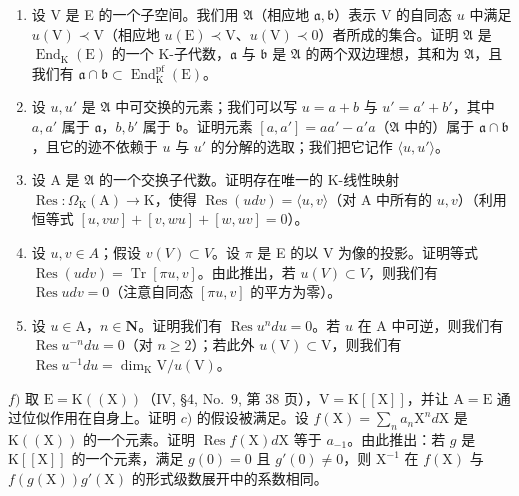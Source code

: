 \begin{enumerate}
\def\labelenumi{\alph{enumi})}
\item
  设 V 是 E 的一个子空间。我们用 \(\mathfrak{A}\)（相应地 \(\mathfrak{a},\mathfrak{b}\)）表示 V 的自同态 \(u\) 中满足 \(u(\mathrm{V})\prec \mathrm{V}\)（相应地 \(u(\mathrm{E})\prec \mathrm{V}\)、\(u(\mathrm{V})\prec 0\)）者所成的集合。证明 \(\mathfrak{A}\) 是 \(\operatorname{End}_{\mathrm{K}}(\mathrm{E})\) 的一个 K-子代数，\(\mathfrak{a}\) 与 \(\mathfrak{b}\) 是 \(\mathfrak{A}\) 的两个双边理想，其和为 \(\mathfrak{A}\)，且我们有 \(\mathfrak{a} \cap \mathfrak{b} \subset \operatorname{End}_{\mathrm{K}}^{\mathrm{pf}}(\mathrm{E})\)。
\item
  设 \(u, u'\) 是 \(\mathfrak{A}\) 中可交换的元素；我们可以写 \(u = a + b\) 与 \(u' = a' + b'\)，其中 \(a, a'\) 属于 \(\mathfrak{a}\)，\(b, b'\) 属于 \(\mathfrak{b}\)。证明元素 \([a, a'] = aa' - a'a\)（\(\mathfrak{A}\) 中的）属于 \(\mathfrak{a} \cap \mathfrak{b}\)，且它的迹不依赖于 \(u\) 与 \(u'\) 的分解的选取；我们把它记作 \(\langle u, u' \rangle\)。
\item
  设 A 是 \(\mathfrak{A}\) 的一个交换子代数。证明存在唯一的 K-线性映射 \(\operatorname{Res}:\Omega_{\mathrm{K}}(\mathrm{A})\to \mathrm{K}\)，使得 \(\operatorname{Res}(udv) = \langle u,v\rangle\)（对 A 中所有的 \(u,v\)）（利用恒等式 \([u,vw] + [v,wu] + [w,uv] = 0\)）。
\item
  设 \(u, v \in A\)；假设 \(v(V) \subset V\)。设 \(\pi\) 是 E 的以 V 为像的投影。证明等式 \(\operatorname{Res}(u dv) = \operatorname{Tr}[\pi u, v]\)。由此推出，若 \(u(V) \subset V\)，则我们有 \(\operatorname{Res} u dv = 0\)（注意自同态 \([\pi u, v]\) 的平方为零）。
\item
  设 \(u \in \mathrm{A}\)，\(n \in \mathbf{N}\)。证明我们有 \(\operatorname{Res} u^n du = 0\)。若 \(u\) 在 \(\mathrm{A}\) 中可逆，则我们有 \(\operatorname{Res} u^{-n} du = 0\)（对 \(n \geqslant 2\)）；若此外 \(u(\mathrm{V}) \subset \mathrm{V}\)，则我们有 \(\operatorname{Res} u^{-1} du = \dim_{\mathrm{K}} \mathrm{V} / u(\mathrm{V})\)。
\end{enumerate}

\(f)\) 取 \(\mathrm{E} = \mathrm{K}((\mathrm{X}))\)（IV, §4, No.~9, 第 38 页），\(\mathrm{V} = \mathrm{K}[[\mathrm{X}]]\)，并让 \(\mathrm{A} = \mathrm{E}\) 通过位似作用在自身上。证明 \(c)\) 的假设被满足。设 \(f(\mathrm{X}) = \sum_{n} a_{n} \mathrm{X}^{n} d\mathrm{X}\) 是 \(\mathrm{K}((\mathrm{X}))\) 的一个元素。证明 \(\operatorname{Res} f(\mathrm{X}) d\mathrm{X}\) 等于 \(a_{-1}\)。由此推出：若 \(g\) 是 \(\mathrm{K}[[\mathrm{X}]]\) 的一个元素，满足 \(g(0) = 0\) 且 \(g'(0) \neq 0\)，则 \(\mathrm{X}^{-1}\) 在 \(f(\mathrm{X})\) 与 \(f(g(\mathrm{X})) g'( \mathrm{X})\) 的形式级数展开中的系数相同。

\backmatter
